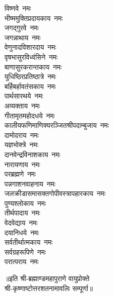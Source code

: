 \begin{multicols}{2}
\begin{flushleft}
विष्णवे~नमः\\
भीष्ममुक्तिप्रदायकाय~नमः\\
जगद्गुरवे~नमः\\
जगन्नाथाय~नमः\\
वेणुनादविशारदाय~नमः\\
वृषभासुरविध्वंसिने~नमः\\
बाणासुरकरान्तकाय~नमः\\
युधिष्ठिरप्रतिष्ठात्रे~नमः\\
बर्हिबर्हावतंसकाय~नमः\hfill{}\\
पार्थसारथये~नमः\\
अव्यक्ताय~नमः\\
गीतामृतमहोदधये~नमः\\
कालीयफणिमाणिक्य\-रञ्जित\-श्री\-पदाम्बुजाय~नमः\\
दामोदराय~नमः\\
यज्ञभोक्त्रे~नमः\\
दानवेन्द्रविनाशकाय~नमः\\
नारायणाय~नमः\\
परब्रह्मणे~नमः\\
पन्नगाशनवाहनाय~नमः\hfill{}\\
जलक्रीडासमासक्त\-गोपी\-वस्त्रापहारकाय~नमः\\
पुण्यश्लोकाय~नमः\\
तीर्थपादाय~नमः\\
वेदवेद्याय~नमः\\
दयानिधये~नमः\\
सर्वतीर्थात्मकाय~नमः\\
सर्वग्रहरूपिणे~नमः\\
परात्पराय~नमः\\
\end{flushleft}
\end{multicols}
॥इति श्री-ब्रह्माण्डमहापुराणे वायुप्रोक्ते\\श्री-कृष्णाष्टोत्तरशतनामावलिः सम्पूर्णा॥
